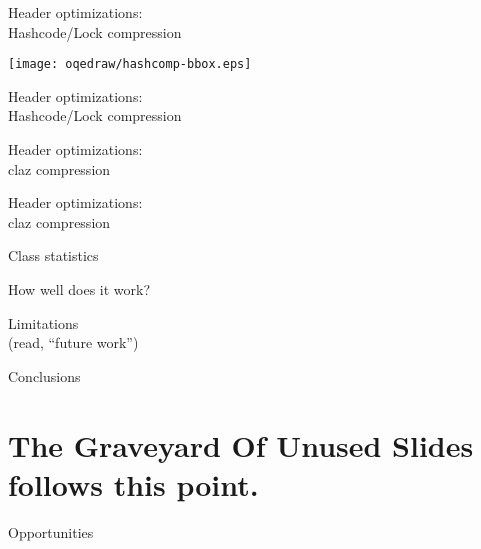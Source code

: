 \documentclass[%
pdf,
colorBG,
slideColor,
nototal,
oqe
]{prosper}
\begin{document}
\begin{slide}{Header optimizations:\\\small Hashcode/Lock compression}
\begin{center}
\vspace{.5cm}
\texttt{[image: oqedraw/hashcomp-bbox.eps]}
\end{center}
\end{slide}

\begin{slide}{Header optimizations:\\\small Hashcode/Lock compression}
\end{slide}

\begin{slide}{Header optimizations:\\\small claz compression}
\end{slide}

\begin{slide}{Header optimizations:\\\small claz compression}
\end{slide}

\begin{slide}{Class statistics}
\end{slide}

\begin{slide}{How well does it work?}
\end{slide}

\begin{slide}{Limitations \\ \small (read, ``future work'')}
\end{slide}

\begin{slide}{Conclusions}
\end{slide}

\part{The Graveyard Of Unused Slides follows this point.}

\begin{slide}{Opportunities}
\end{slide}

\end{document}
